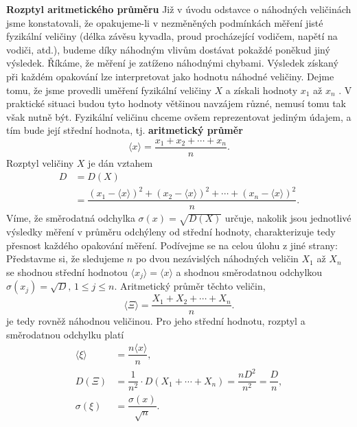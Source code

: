 \begin{mdframed}[style=mdexam]
  \begin{example}\label{mai:exam073}
    \textbf{Rozptyl aritmetického průměru}\newline
    Již v úvodu odstavce o náhodných veličinách jsme konstatovali, že opakujeme-li v nezměněných
    podmínkách měření jisté fyzikální veličiny (délka závěsu kyvadla, proud procházející vodičem,
    napětí na vodiči, atd.), budeme díky náhodným vlivům dostávat pokaždé poněkud jiný výsledek.
    Říkáme, že měření je zatíženo náhodnými chybami. Výsledek získaný při každém opakování lze
    interpretovat jako hodnotu náhodné veličiny. Dejme tomu, že jsme provedli uměření fyzikální
    veličiny \(X\) a získali hodnoty \(x_1\) až \(x_n\) . V praktické situaci budou tyto hodnoty
    většinou navzájem různé, nemusí tomu tak však nutně být. Fyzikální veličinu chceme ovšem
    reprezentovat jediným údajem, a tím bude její střední hodnota, tj.
    \textbf{aritmetický průměr}
    \begin{equation*}
      \langle x \rangle = \dfrac{x_1 + x_2 + \cdots + x_n}{n}.
    \end{equation*}
    Rozptyl veličiny \(X\) je dán vztahem
    \begin{align*}
      D &= D(X)                                                             \\
        &= \dfrac{\left(x_1 - \langle x \rangle\right)^2 + 
                  \left(x_2 - \langle x \rangle\right)^2 + \cdots +
                  \left(x_n - \langle x \rangle\right)^2}{n}.
    \end{align*}
    Víme, že směrodatná odchylka \(\sigma( x ) = \sqrt{D(X)}\) určuje, nakolik jsou jednotlivé
    výsledky měření v průměru odchýleny od střední hodnoty, charakterizuje tedy přesnost každého
    opakování měření. Podívejme se na celou úlohu z jiné strany: Představme si, že sledujeme \(n\)
    po dvou nezávislých náhodných veličin \(X_1\) až \(X_n\) se shodnou střední hodnotou \(\langle
    x_j \rangle = \langle x \rangle\) a shodnou směrodatnou odchylkou \(\sigma(x_j) = \sqrt{D},\, 1
    \leq j \leq n\). Aritmetický průměr těchto veličin,
    \begin{equation*}
      \langle \Xi \rangle = \dfrac{X_1 + X_2 + \cdots + X_n}{n}.
    \end{equation*}
    je tedy rovněž náhodnou veličinou. Pro jeho střední hodnotu, rozptyl a směrodatnou odchylku
    platí
    \begin{align*}
      \langle \xi \rangle 
                  &= \dfrac{n\langle x \rangle}{n}, \\
      D(\Xi)      &= \dfrac{1}{n^2}\cdot D(X_1 + \cdots + X_n)=\dfrac{nD^2}{n^2}=\dfrac{D}{n}, \\
      \sigma(\xi) &= \dfrac{\sigma(x)}{\sqrt{n}}.
    \end{align*}
  \end{example}
\end{mdframed}